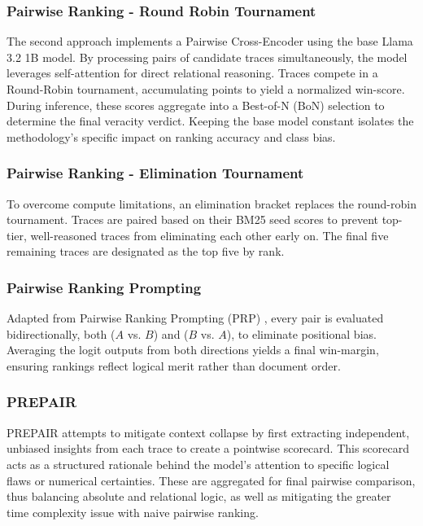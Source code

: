 \documentclass[
]{ceurart}
\begin{document}
\subsubsection{Pairwise Ranking - Round Robin Tournament}

The second approach implements a Pairwise Cross-Encoder \cite{lee2025evaluating} using the base Llama 3.2 1B model. By processing pairs of candidate traces simultaneously, the model leverages self-attention for direct relational reasoning. Traces compete in a Round-Robin tournament, accumulating points to yield a normalized win-score. During inference, these scores aggregate into a Best-of-N (BoN) selection to determine the final veracity verdict. Keeping the base model constant isolates the methodology's specific impact on ranking accuracy and class bias.

\subsubsection{Pairwise Ranking - Elimination Tournament}
To overcome compute limitations, an elimination bracket replaces the round-robin tournament. Traces are paired based on their BM25 seed scores to prevent top-tier, well-reasoned traces from eliminating each other early on. The final five remaining traces are designated as the top five by rank.

\subsubsection{Pairwise Ranking Prompting}
Adapted from Pairwise Ranking Prompting (PRP) \cite{prp}, every pair is evaluated bidirectionally, both ($A$ vs. $B$) and ($B$ vs. $A$), to eliminate positional bias. Averaging the logit outputs from both directions yields a final win-margin, ensuring rankings reflect logical merit rather than document order.

\subsubsection{PREPAIR}
PREPAIR \cite{PrePAIR} attempts to mitigate context collapse by first extracting independent, unbiased insights from each trace to create a pointwise scorecard. This scorecard acts as a structured rationale behind the model's attention to specific logical flaws or numerical certainties. These are aggregated for final pairwise comparison, thus balancing absolute and relational logic, as well as mitigating the greater time complexity issue with naive pairwise ranking. 
\end{document}
